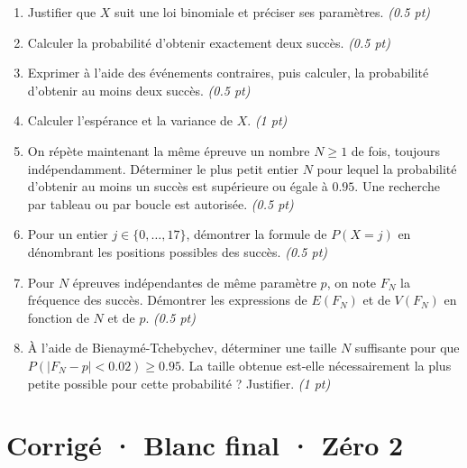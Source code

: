 \begin{enumerate}

\item Justifier que $X$ suit une loi binomiale et préciser ses paramètres. \hfill\textit{(\num{0,5} pt)}

\item Calculer la probabilité d'obtenir exactement deux succès. \hfill\textit{(\num{0,5} pt)}

\item Exprimer à l'aide des événements contraires, puis calculer, la probabilité d'obtenir au moins deux succès. \hfill\textit{(\num{0,5} pt)}

\item Calculer l'espérance et la variance de $X$. \hfill\textit{(1 pt)}

\item On répète maintenant la même épreuve un nombre $N\ge1$ de fois, toujours indépendamment. Déterminer le plus petit entier $N$ pour lequel la probabilité d'obtenir au moins un succès est supérieure ou égale à $\num{0,95}$. Une recherche par tableau ou par boucle est autorisée. \hfill\textit{(\num{0,5} pt)}

\item Pour un entier $j\in\{0,\ldots,17\}$, démontrer la formule de $P(X=j)$ en dénombrant les positions possibles des succès. \hfill\textit{(\num{0,5} pt)}

\item Pour $N$ épreuves indépendantes de même paramètre $p$, on note $F_N$ la fréquence des succès. Démontrer les expressions de $E(F_N)$ et de $V(F_N)$ en fonction de $N$ et de $p$. \hfill\textit{(\num{0,5} pt)}

\item À l'aide de Bienaymé-Tchebychev, déterminer une taille $N$ suffisante pour que $P(|F_N-p|<\num{0,02})\ge\num{0,95}$. La taille obtenue est-elle nécessairement la plus petite possible pour cette probabilité ? Justifier. \hfill\textit{(1 pt)}

\end{enumerate}

\ifmxteacher\mxnewpage

\section*{Corrigé · Blanc final · Zéro 2}\label{cor:9-2}

